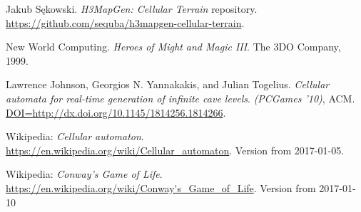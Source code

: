 \documentclass[a4paper, 11pt]{article} %
\begin{document}
\begin{thebibliography}{9}
	
	Jakub Sękowski.
	\emph{H3MapGen: Cellular Terrain} repository.
	\url{https://github.com/sequba/h3mapgen-cellular-terrain}.

	New World Computing.
	\emph{Heroes of Might and Magic III}.
	The 3DO Company,
	1999.

	Lawrence Johnson, Georgios N. Yannakakis, and Julian Togelius.
	\emph{Cellular automata for real-time generation of infinite cave levels}.
	\emph{(PCGames '10)}, ACM.
	\url{DOI=http://dx.doi.org/10.1145/1814256.1814266}.

        Wikipedia: \emph{Cellular automaton}.
        \url{https://en.wikipedia.org/wiki/Cellular_automaton}.
        Version from 2017-01-05.

	Wikipedia: \emph{Conway's Game of Life}.
	\url{https://en.wikipedia.org/wiki/Conway's_Game_of_Life}.
	Version from 2017-01-10

\end{thebibliography}

\end{document}
